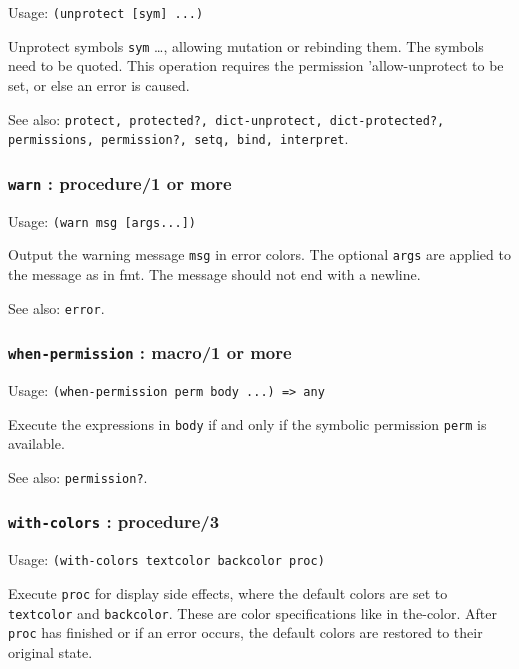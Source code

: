\documentclass[
]{article}
\newcommand{\passthrough}[1]{#1}
\begin{document}
Usage: \passthrough{\lstinline!(unprotect [sym] ...)!}

Unprotect symbols \passthrough{\lstinline!sym!} \ldots, allowing
mutation or rebinding them. The symbols need to be quoted. This
operation requires the permission 'allow-unprotect to be set, or else an
error is caused.

See also:
\passthrough{\lstinline!protect, protected?, dict-unprotect, dict-protected?, permissions, permission?, setq, bind, interpret!}.

\hypertarget{warn-procedure1-or-more}{%
\subsubsection{\texorpdfstring{\texttt{warn} : procedure/1 or
more}{warn : procedure/1 or more}}\label{warn-procedure1-or-more}}

Usage: \passthrough{\lstinline!(warn msg [args...])!}

Output the warning message \passthrough{\lstinline!msg!} in error
colors. The optional \passthrough{\lstinline!args!} are applied to the
message as in fmt. The message should not end with a newline.

See also: \passthrough{\lstinline!error!}.

\hypertarget{when-permission-macro1-or-more}{%
\subsubsection{\texorpdfstring{\texttt{when-permission} : macro/1 or
more}{when-permission : macro/1 or more}}\label{when-permission-macro1-or-more}}

Usage: \passthrough{\lstinline!(when-permission perm body ...) => any!}

Execute the expressions in \passthrough{\lstinline!body!} if and only if
the symbolic permission \passthrough{\lstinline!perm!} is available.

See also: \passthrough{\lstinline!permission?!}.

\hypertarget{with-colors-procedure3}{%
\subsubsection{\texorpdfstring{\texttt{with-colors} :
procedure/3}{with-colors : procedure/3}}\label{with-colors-procedure3}}

Usage: \passthrough{\lstinline!(with-colors textcolor backcolor proc)!}

Execute \passthrough{\lstinline!proc!} for display side effects, where
the default colors are set to \passthrough{\lstinline!textcolor!} and
\passthrough{\lstinline!backcolor!}. These are color specifications like
in the-color. After \passthrough{\lstinline!proc!} has finished or if an
error occurs, the default colors are restored to their original state.
\end{document}

